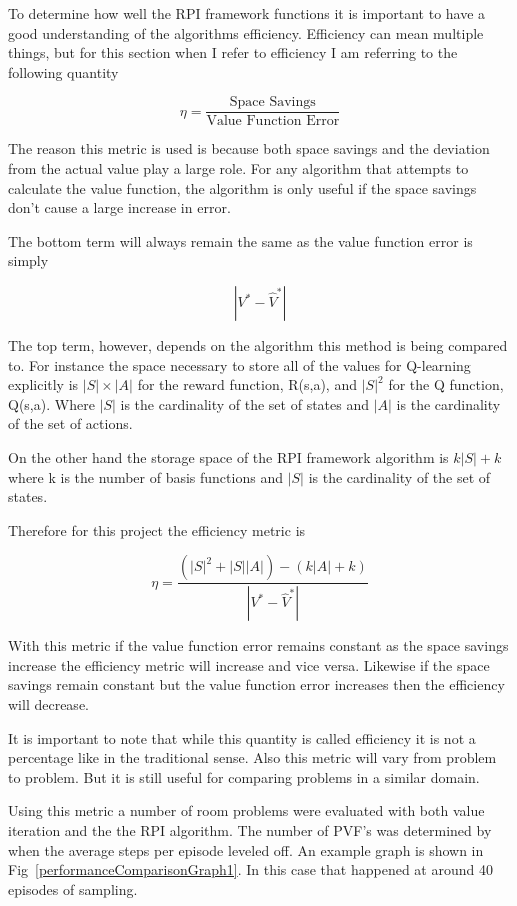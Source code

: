 \documentclass[12pt, letterpaper, final]{report}
\begin{document}
To determine how well the RPI framework functions it is important to
have a good understanding of the algorithms efficiency. Efficiency can
mean multiple things, but for this section when I refer to efficiency
I am referring to the following quantity

\[
\eta = \frac{\text{Space Savings}}{\text{Value Function Error}}
\]

The reason this metric is used is because both space savings and the
deviation from the actual value play a large role. For any algorithm
that attempts to calculate the value function, the algorithm is only
useful if the space savings don't cause a large increase in error. 

The bottom term will always remain the same as the value function
error is simply

\[
| V^{*} - \hat{V}^{*}|
\]

The top term, however, depends on the algorithm this method is being
compared to. For instance the space necessary to store all of the
values for Q-learning explicitly is $|S| \times |A|$ for the reward
function, R(s,a), and $|S|^2$ for the Q function, Q(s,a). Where $|S|$ is
the cardinality of the set of states and $|A|$ is the cardinality of
the set of actions.

On the other hand the storage space of the RPI framework algorithm is 
$k|S|+k$ where k is the number of basis functions and $|S|$ is the
cardinality of the set of states.

Therefore for this project the efficiency metric is

\[
\eta = \frac{(|S|^2 + |S||A|) - (k|A| + k)}{|V^{*} - \hat{V}^{*}|}
\]

With this metric if the value function error remains constant as the
space savings increase the efficiency metric will increase and vice
versa. Likewise if the space savings remain constant but the value
function error increases then the efficiency will decrease. 

It is
important to note that while this quantity is called efficiency it is
not a percentage like in the traditional sense. Also this metric will
vary from problem to problem. But it is still useful for comparing
problems in a similar domain.

Using this metric a number of room problems were evaluated with both
value iteration and the the RPI algorithm. The number of PVF's was
determined by when the average steps per episode leveled off. An
example graph is shown in Fig~\ref{performanceComparisonGraph1}. In this
case that happened at around 40 episodes of sampling.
\end{document}
